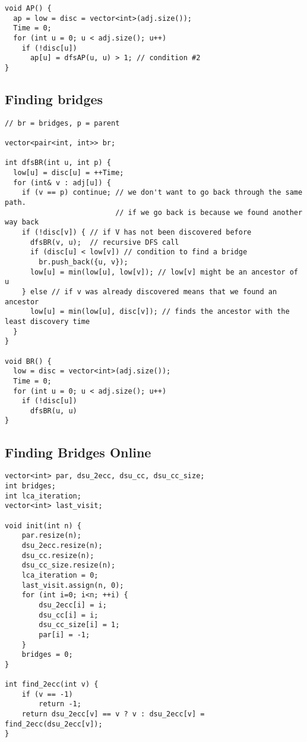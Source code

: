 \documentclass[10pt]{article}
\begin{document}
\begin{multicols*}{2}
\begin{lstlisting}[style=compactcpp]
void AP() {
  ap = low = disc = vector<int>(adj.size());
  Time = 0;
  for (int u = 0; u < adj.size(); u++)
    if (!disc[u])
      ap[u] = dfsAP(u, u) > 1; // condition #2
}
\end{lstlisting}

\subsection{Finding bridges}

\begin{lstlisting}[style=compactcpp]
// br = bridges, p = parent

vector<pair<int, int>> br;

int dfsBR(int u, int p) {
  low[u] = disc[u] = ++Time;
  for (int& v : adj[u]) {
    if (v == p) continue; // we don't want to go back through the same path.
                          // if we go back is because we found another way back
    if (!disc[v]) { // if V has not been discovered before
      dfsBR(v, u);  // recursive DFS call
      if (disc[u] < low[v]) // condition to find a bridge
        br.push_back({u, v});
      low[u] = min(low[u], low[v]); // low[v] might be an ancestor of u
    } else // if v was already discovered means that we found an ancestor
      low[u] = min(low[u], disc[v]); // finds the ancestor with the least discovery time
  }
}

void BR() {
  low = disc = vector<int>(adj.size());
  Time = 0;
  for (int u = 0; u < adj.size(); u++)
    if (!disc[u])
      dfsBR(u, u)
}
\end{lstlisting}

\subsection{Finding Bridges Online}

\begin{lstlisting}[style=compactcpp]
vector<int> par, dsu_2ecc, dsu_cc, dsu_cc_size;
int bridges;
int lca_iteration;
vector<int> last_visit;

void init(int n) {
    par.resize(n);
    dsu_2ecc.resize(n);
    dsu_cc.resize(n);
    dsu_cc_size.resize(n);
    lca_iteration = 0;
    last_visit.assign(n, 0);
    for (int i=0; i<n; ++i) {
        dsu_2ecc[i] = i;
        dsu_cc[i] = i;
        dsu_cc_size[i] = 1;
        par[i] = -1;
    }
    bridges = 0;
}

int find_2ecc(int v) {
    if (v == -1)
        return -1;
    return dsu_2ecc[v] == v ? v : dsu_2ecc[v] = find_2ecc(dsu_2ecc[v]);
}


\end{lstlisting}
\end{multicols*}
\end{document}
